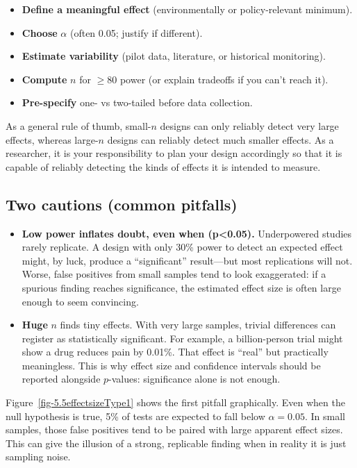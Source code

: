 \documentclass[
  letterpaper,
  DIV=11,
  numbers=noendperiod]{scrreprt}
\providecommand{\tightlist}{%
  \setlength{\itemsep}{0pt}\setlength{\parskip}{0pt}}
\begin{document}
\begin{itemize}
\tightlist
\item
  \textbf{Define a meaningful effect} (environmentally or
  policy-relevant minimum).
\item
  \textbf{Choose} \(\alpha\) (often 0.05; justify if different).
\item
  \textbf{Estimate variability} (pilot data, literature, or historical
  monitoring).
\item
  \textbf{Compute} \(n\) for \(\ge 80%
  \) power (or explain tradeoffs if you can't reach it).
\item
  \textbf{Pre-specify} one- vs two-tailed before data collection.
\end{itemize}

As a general rule of thumb, small-\(n\) designs can only reliably detect
very large effects, whereas large-\(n\) designs can reliably detect much
smaller effects. As a researcher, it is your responsibility to plan your
design accordingly so that it is capable of reliably detecting the kinds
of effects it is intended to measure.

\subsection{Two cautions (common
pitfalls)}\label{two-cautions-common-pitfalls}

\begin{itemize}
\item
  \textbf{Low power inflates doubt, even when (p\textless0.05).}
  Underpowered studies rarely replicate. A design with only 30\% power
  to detect an expected effect might, by luck, produce a ``significant''
  result---but most replications will not. Worse, false positives from
  small samples tend to look exaggerated: if a spurious finding reaches
  significance, the estimated effect size is often large enough to seem
  convincing.
\item
  \textbf{Huge} \(n\) finds tiny effects. With very large samples,
  trivial differences can register as statistically significant. For
  example, a billion-person trial might show a drug reduces pain by
  0.01\%. That effect is ``real'' but practically meaningless. This is
  why effect size and confidence intervals should be reported alongside
  \(p\)-values: significance alone is not enough.
\end{itemize}

Figure~\ref{fig-5.5effectsizeType1} shows the first pitfall graphically.
Even when the null hypothesis is true, 5\% of tests are expected to fall
below \(\alpha = 0.05\). In small samples, those false positives tend to
be paired with large apparent effect sizes. This can give the illusion
of a strong, replicable finding when in reality it is just sampling
noise.
\end{document}
